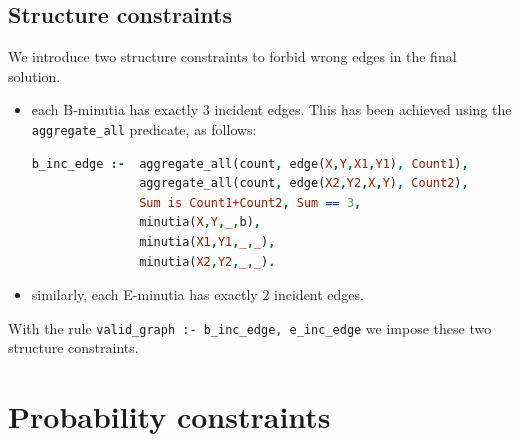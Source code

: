 \documentclass[8pt]{article}
\begin{document}
\subsection{Structure constraints}\label{sub:structure_cons}
We introduce two structure constraints to forbid wrong edges
in the final solution.
\begin{itemize}
  \item
    each B-minutia has exactly $3$ incident edges. This has been achieved
    using the \texttt{aggregate\_all} predicate, as follows:
      \begin{lstlisting}[language=Prolog,frame = single,basicstyle=\footnotesize\ttfamily]
b_inc_edge :-  aggregate_all(count, edge(X,Y,X1,Y1), Count1),
               aggregate_all(count, edge(X2,Y2,X,Y), Count2),
               Sum is Count1+Count2, Sum == 3,
               minutia(X,Y,_,b),
               minutia(X1,Y1,_,_),
               minutia(X2,Y2,_,_).
      \end{lstlisting}
  \item
    similarly, each E-minutia has exactly $2$ incident edges.
\end{itemize}
With the rule \texttt{valid\_graph :- b\_inc\_edge, e\_inc\_edge} we impose
these two structure constraints.

\section{Probability constraints}
\end{document}
